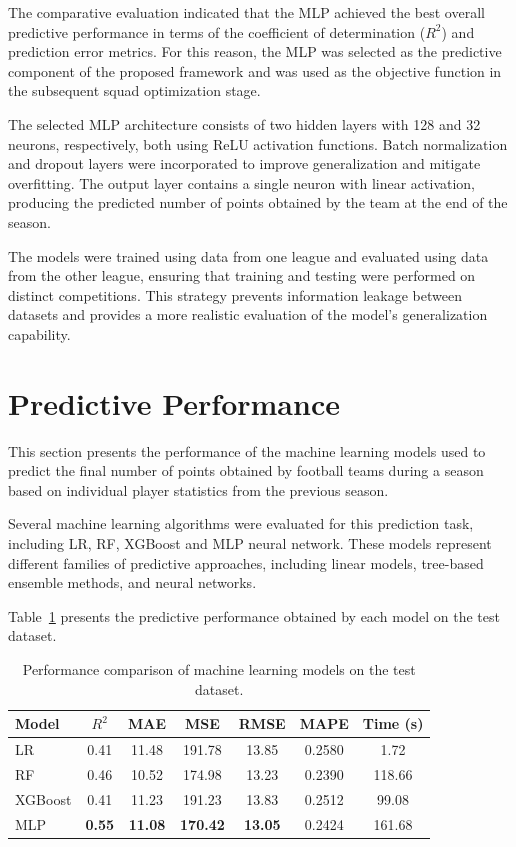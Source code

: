 \documentclass[a4paper,fleqn]{cas-sc}
\begin{document}
The comparative evaluation indicated that the MLP achieved the best overall predictive performance in terms of the coefficient of determination
($R^2$) and prediction error metrics. For this reason, the MLP was selected as the predictive component of the proposed framework and was used
as the objective function in the subsequent squad optimization stage.

The selected MLP architecture consists of two hidden layers with 128 and 32 neurons, respectively, both using ReLU activation functions.
Batch normalization and dropout layers were incorporated to improve generalization and mitigate overfitting. The output layer contains a
single neuron with linear activation, producing the predicted number of points obtained by the team at the end of the season.

The models were trained using data from one league and evaluated using data from the other league, ensuring that training and testing were
performed on distinct competitions. This strategy prevents information leakage between datasets and provides a more realistic evaluation of
the model's generalization capability.

\section{Predictive Performance}

This section presents the performance of the machine learning models used to predict the final number of points obtained by football teams during a season
based on individual player statistics from the previous season.

Several machine learning algorithms were evaluated for this prediction task, including LR, RF, XGBoost and MLP neural network. 
These models represent different families of predictive approaches, including linear models, tree-based ensemble methods, and neural networks.

Table~\ref{tab:model_comparison} presents the predictive performance obtained by each model on the test dataset.

\begin{table}[htbp]
\centering
\caption{Performance comparison of machine learning models on the test dataset.}
\label{tab:model_comparison}
\begin{tabular}{lcccccc}
\toprule
Model & $R^2$ & MAE & MSE & RMSE & MAPE & Time (s) \\
\midrule
LR        & 0.41 & 11.48 & 191.78 & 13.85 & 0.2580 & 1.72 \\
RF        & 0.46 & 10.52 & 174.98 & 13.23 & 0.2390 & 118.66 \\
XGBoost   & 0.41 & 11.23 & 191.23 & 13.83 & 0.2512 & 99.08 \\
MLP       & \textbf{0.55} & \textbf{11.08} & \textbf{170.42} & \textbf{13.05} & 0.2424 & 161.68 \\
\bottomrule
\end{tabular}
\end{table}
\end{document}
